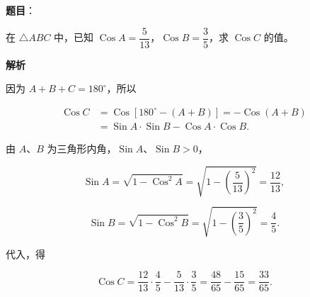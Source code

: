 \begin{answer}

\textbf{题目}：

在 $\triangle ABC$ 中，已知 $\operatorname{Cos}A=\dfrac5{13}$，$\operatorname{Cos}B=\dfrac35$，求 $\operatorname{Cos}C$ 的值。

\textbf{解析}

因为 $A+B+C=180^\circ$，所以

\nopagebreak[4]
\[
\begin{aligned}
\operatorname{Cos}C
&=\operatorname{Cos}\left[180^\circ-(A+B)\right]
=-\operatorname{Cos}(A+B)\\
&=\operatorname{Sin}A\cdot\operatorname{Sin}B-\operatorname{Cos}A\cdot\operatorname{Cos}B.
\end{aligned}
\]

由 $A\text{、}B$ 为三角形内角，$\operatorname{Sin}A\text{、}\operatorname{Sin}B>0$，

\nopagebreak[4]
\[
\operatorname{Sin}A=\sqrt{1-\operatorname{Cos}^2A}
=\sqrt{1-\left(\frac5{13}\right)^2}=\frac{12}{13},
\]

\nopagebreak[4]
\[
\operatorname{Sin}B=\sqrt{1-\operatorname{Cos}^2B}
=\sqrt{1-\left(\frac35\right)^2}=\frac45.
\]

代入，得

\nopagebreak[4]
\[
\operatorname{Cos}C=\frac{12}{13}\cdot\frac45-\frac5{13}\cdot\frac35
=\frac{48}{65}-\frac{15}{65}=\frac{33}{65}.
\]


\end{answer}

